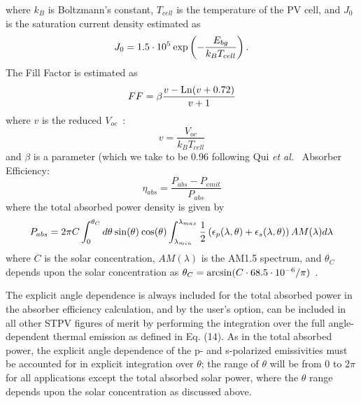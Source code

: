 \documentclass[journal=jpclcd,manuscript=suppinfo]{achemso}
\begin{document}
where $k_B$ is Boltzmann's constant, $T_{cell}$ is the temperature of the PV cell,
and $J_0$ is the saturation current density estimated as~\cite{QHM_Solar_2005, JHR_AdvEnMat_2018}
\begin{equation}
J_0 = 1.5 \cdot 10^5 \: {\rm exp}\left( - \frac{E_{bg}}{k_B T_{cell}} \right).
\end{equation}
The Fill Factor is estimated as~\cite{QHM_Solar_2005, JHR_AdvEnMat_2018} 
\begin{equation}
FF = \beta \frac{v - {\rm Ln}(v + 0.72)}{v+1}
\end{equation}
where $v$ is the reduced $V_{oc}$~\cite{QHM_Solar_2005, JHR_AdvEnMat_2018}:
\begin{equation}
v = \frac{V_{oc}}{k_B T_{cell}}
\end{equation}
and $\beta$ is a parameter (which we take to be 0.96 following Qui {\it et al.}~\cite{QHM_Solar_2005}
\newline
Absorber Efficiency:
\begin{equation}
\eta_{abs} = \frac{P_{abs} - P_{emit}}{P_{abs}}
\end{equation}
where the total absorbed power density is given by~\cite{RF_OptExp_2009}
\begin{equation}
P_{abs} = 2\pi C \int_0^{\theta_C} d\theta \: {\rm sin}(\theta) \: {\rm cos}(\theta) 
\int_{\lambda_{min}}^{\lambda_{max}}\frac{1}{2} \left(\epsilon_p(\lambda, \theta) + \epsilon_s(\lambda, \theta) \right) AM(\lambda) d\lambda
\end{equation}
where $C$ is the solar concentration, $AM(\lambda)$ is the AM1.5 spectrum, and $\theta_C$ depends upon
the solar concentration as $\theta_C = {\rm arcsin}(C \cdot 68.5 \cdot 10^{-6} / \pi)$~\cite{RF_OptExp_2009}.

The explicit angle dependence is always included for the total absorbed power in the absorber efficiency 
calculation, and by the user's option, can be included in all other STPV figures of merit by performing
the integration over the full angle-dependent thermal emission as defined in Eq. (14).  As in the 
total absorbed power, the explicit angle dependence of the p- and s-polarized emissivities must be accounted
for in explicit integration over $\theta$; the range of $\theta$ will be from $0$ to $2\pi$ for all applications
except the total absorbed solar power, where the $\theta$ range depends upon the solar concentration as discussed above.
\end{document}
